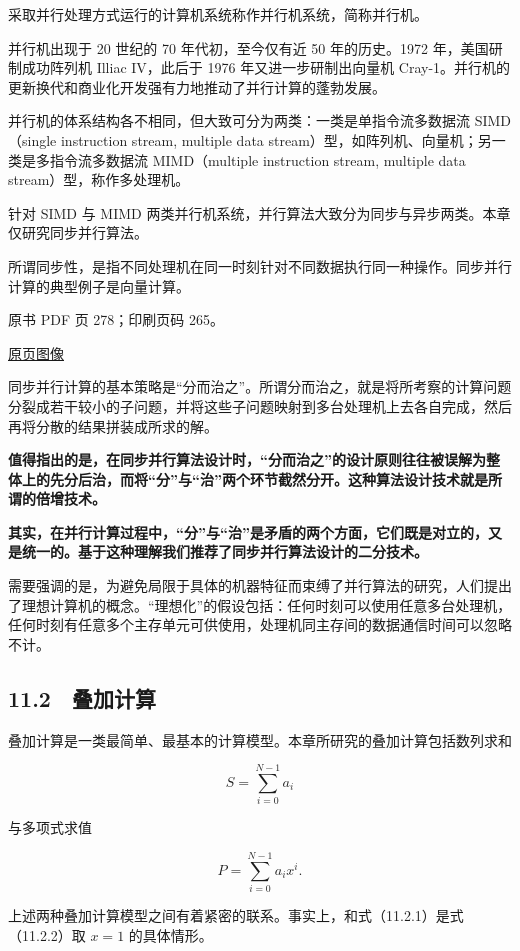 采取并行处理方式运行的计算机系统称作并行机系统，简称并行机。

并行机出现于 20 世纪的 70 年代初，至今仅有近 50 年的历史。1972 年，美国研制成功阵列机 Illiac IV，此后于 1976 年又进一步研制出向量机 Cray-1。并行机的更新换代和商业化开发强有力地推动了并行计算的蓬勃发展。

并行机的体系结构各不相同，但大致可分为两类：一类是单指令流多数据流 SIMD（single instruction stream, multiple data stream）型，如阵列机、向量机；另一类是多指令流多数据流 MIMD（multiple instruction stream, multiple data stream）型，称作多处理机。

针对 SIMD 与 MIMD 两类并行机系统，并行算法大致分为同步与异步两类。本章仅研究同步并行算法。

所谓同步性，是指不同处理机在同一时刻针对不同数据执行同一种操作。同步并行计算的典型例子是向量计算。

\clearpage

原书 PDF 页 278；印刷页码 265。

\href{source-images/pdf-278.jpeg}{原页图像}

同步并行计算的基本策略是``分而治之''。所谓分而治之，就是将所考察的计算问题分裂成若干较小的子问题，并将这些子问题映射到多台处理机上去各自完成，然后再将分散的结果拼装成所求的解。

\textbf{值得指出的是，在同步并行算法设计时，``分而治之''的设计原则往往被误解为整体上的先分后治，而将``分''与``治''两个环节截然分开。这种算法设计技术就是所谓的倍增技术。}

\textbf{其实，在并行计算过程中，``分''与``治''是矛盾的两个方面，它们既是对立的，又是统一的。基于这种理解我们推荐了同步并行算法设计的二分技术。}

需要强调的是，为避免局限于具体的机器特征而束缚了并行算法的研究，人们提出了理想计算机的概念。``理想化''的假设包括：任何时刻可以使用任意多台处理机，任何时刻有任意多个主存单元可供使用，处理机同主存间的数据通信时间可以忽略不计。

\subsection{11.2　叠加计算}\label{ch11-ux53e0ux52a0ux8ba1ux7b97}

叠加计算是一类最简单、最基本的计算模型。本章所研究的叠加计算包括数列求和

\[
S=\sum_{i=0}^{N-1}a_i
\tag{11.2.1}
\]

与多项式求值

\[
P=\sum_{i=0}^{N-1}a_i x^i.
\tag{11.2.2}
\]

上述两种叠加计算模型之间有着紧密的联系。事实上，和式（11.2.1）是式（11.2.2）取 \(x=1\) 的具体情形。

